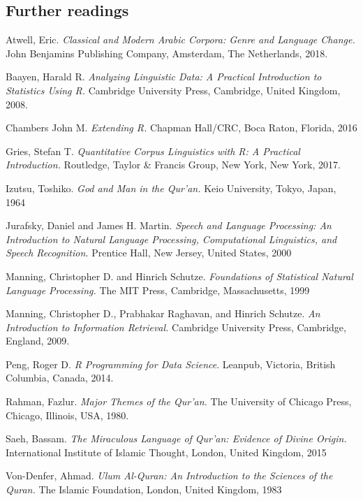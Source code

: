\documentclass[
]{article}
\begin{document}
\hypertarget{further-readings}{%
\subsection{Further readings}\label{further-readings}}

Atwell, Eric. \emph{Classical and Modern Arabic Corpora: Genre and Language Change.} John Benjamins Publishing Company, Amsterdam, The Netherlands, 2018. \citep{atwell2018}

Baayen, Harald R. \emph{Analyzing Linguistic Data: A Practical Introduction to Statistics Using R.} Cambridge University Press, Cambridge, United Kingdom, 2008. \citep{baayen2008}

Chambers John M. \emph{Extending R.} Chapman Hall/CRC, Boca Raton, Florida, 2016 \citep{chambers2016}

Gries, Stefan T. \emph{Quantitative Corpus Linguistics with R: A Practical Introduction.} Routledge, Taylor \& Francis Group, New York, New York, 2017. \citep{gries2017}

Izutsu, Toshiko. \emph{God and Man in the Qur'an.} Keio University, Tokyo, Japan, 1964 \citep{izutsu1964}

Jurafsky, Daniel and James H. Martin. \emph{Speech and Language Processing: An Introduction to Natural Language Processing, Computational Linguistics, and Speech Recognition.} Prentice Hall, New Jersey, United States, 2000 \citep{jurafsky2000}

Manning, Christopher D. and Hinrich Schutze. \emph{Foundations of Statistical Natural Language Processing.} The MIT Press, Cambridge, Massachusetts, 1999 \citep{manning1999}

Manning, Christopher D., Prabhakar Raghavan, and Hinrich Schutze. \emph{An Introduction to Information Retrieval.} Cambridge University Press, Cambridge, England, 2009. \citep{manning2009}

Peng, Roger D. \emph{R Programming for Data Science}. Leanpub, Victoria, British Columbia, Canada, 2014. \citep{peng2014}

Rahman, Fazlur. \emph{Major Themes of the Qur'an.} The University of Chicago Press, Chicago, Illinois, USA, 1980. \citep{rahman1980}

Saeh, Bassam. \emph{The Miraculous Language of Qur'an: Evidence of Divine Origin.} International Institute of Islamic Thought, London, United Kingdom, 2015 \citep{saeh2015}

Von-Denfer, Ahmad. \emph{Ulum Al-Quran: An Introduction to the Sciences of the Quran.} The Islamic Foundation, London, United Kingdom, 1983 \citep{vondenfer1983}
\end{document}
